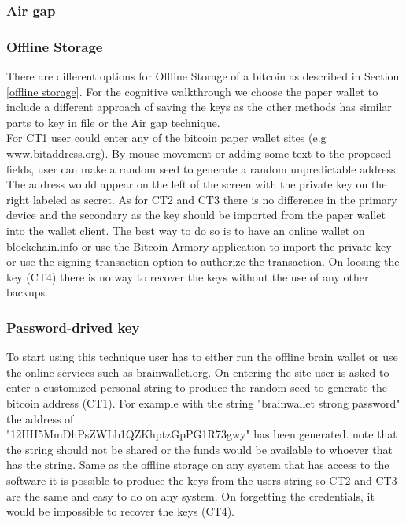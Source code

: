 

\subsubsection{Air gap}
\label{sec:air gap}


\subsubsection{Offline Storage}
There are different options for Offline Storage of a bitcoin as described in Section \ref{offline storage}. For the cognitive walkthrough we choose the paper wallet to include a different approach of saving the keys as the other methods has similar parts to key in file or the Air gap technique.\\
For CT1 user could enter any of the bitcoin paper wallet sites (e.g www.bitaddress.org). By mouse movement or adding some text to the proposed fields, user can make a random seed to generate a random unpredictable address. The address would appear on the left of the screen with the private key on the right labeled as secret. As for CT2 and CT3 there is no difference in the primary device and the secondary as the key should be imported from the paper wallet into the wallet client. The best way to do so is to have an online wallet on blockchain.info or use the Bitcoin Armory application to import the private key or use the signing transaction option to authorize the transaction. On loosing the key (CT4) there is no way to recover the keys without the use of any other backups.

\subsubsection{Password-drived key}
To start using this technique user has to either run the offline brain wallet or use the online services such as brainwallet.org. On entering the site user is asked to enter a customized personal string to produce the random seed to generate the bitcoin address (CT1). For example with the string "brainwallet strong password" the address of \\ "12HH5MmDhPsZWLb1QZKhptzGpPG1R73gwy" has been generated. note that the string should not be shared or the funds would be available to whoever that has the string. Same as the offline storage on any system that has access to the software it is possible to produce the keys from the users string so CT2 and CT3 are the same and easy to do on any system. On forgetting the credentials, it would be impossible to recover the keys (CT4).


